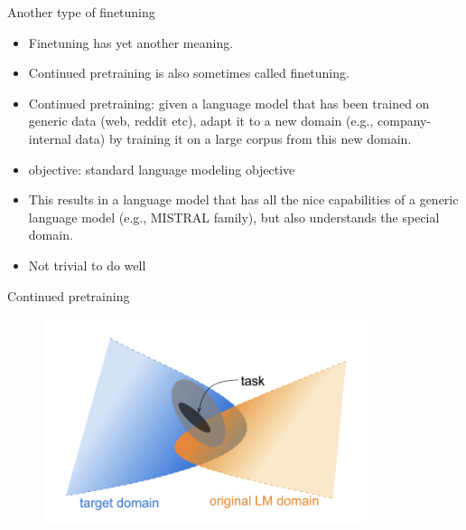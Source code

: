 

\begin{frame}{Another type of finetuning}

\vfill

\begin{itemize}
    \item Finetuning has yet another meaning.
    \item Continued pretraining is also sometimes called
    finetuning.
    \item Continued pretraining: given a language model
that has been    trained on generic data (web, reddit etc),
    adapt it to a new domain (e.g., company-internal data) by
    training it on a large corpus from this new domain.
\item objective: standard language modeling objective
    \item This results in a language model that has all the
    nice capabilities of a generic language model (e.g.,
    MISTRAL family), but also understands the special domain.
\item Not trivial to do well
\end{itemize}

\vfill

\end{frame}

\begin{frame}{Continued pretraining}

\vfill
	
	\begin{figure}
		\centering
		\includegraphics[height = 6cm]{figure/continuedpretraining1} 
	\end{figure}

\vfill

\end{frame}


